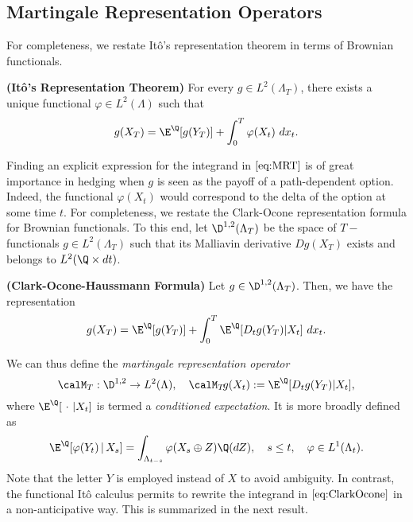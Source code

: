 \subsection{Martingale Representation Operators} \label{sec:MRO}
For completeness, we restate It\^o's representation theorem in terms of Brownian functionals.      

\begin{theorem}\label{thm:ClarkOcone}\textbf{(It\^o's Representation Theorem)}
For every $g\in L^2(\Lambda_T)$, there exists a unique functional $\varphi \in L^2(\Lambda)$ such that
\begin{equation}\label{eq:MRT} 
    g(X_T) = \E^{\Q}[g(Y_T)] + \int_0^T \varphi(X_t) \ dx_t. 
\end{equation}
\end{theorem}
Finding an explicit expression for the integrand in $\eqref{eq:MRT}$ is of great importance in hedging when $g$ is seen as the payoff of a path-dependent option. Indeed, the functional $\varphi(X_t)$ would correspond to the delta of the option at some time $t$.  
For completeness, we restate the Clark-Ocone representation formula \cite{Clark,Ocone} for Brownian functionals. To this end, let $\D^{1,2}(\Lambda_T)$ be the space of $T-$functionals $g\in L^2(\Lambda_T)$
such that its Malliavin derivative $ D g(X_T)$ exists and belongs to $L^2(\Q\times dt)$. 
\begin{theorem}\label{thm:ClarkOcone}\textbf{(Clark-Ocone-Haussmann Formula)}
Let $g\in \D^{1,2}(\Lambda_T)$. Then, we have the representation 
\begin{equation}\label{eq:ClarkOcone} 
    g(X_T) = \E^{\Q}[g(Y_T)] + \int_0^T \E^{\Q}[D_t g(Y_T) | X_t] \ dx_t. 
\end{equation}
\end{theorem}
We can thus define the \textit{martingale representation operator} $$\calM_T: \D^{1,2} \to L^2(\Lambda), \quad
\calM_T \! g(X_t) := \E^{\Q}[D_t g(Y_T) | X_t],$$ 
 where  $\E^{\Q}[ \ \cdot \ | X_t]$ is termed a \textit{conditioned expectation}. %
It is more broadly defined  as 
$$\E^{\Q}[\varphi(Y_t)\,|\, X_s]=  \int_{\Lambda_{t-s}}\varphi(X_s \oplus Z) \Q(dZ),\quad  s \le t ,\quad \varphi\in L^1(\Lambda_t). $$ 
 Note that  the letter $Y$ is employed %
 instead of $X$ to avoid ambiguity. 
In contrast, the functional Itô calculus permits to rewrite the integrand in $\eqref{eq:ClarkOcone}$ in a non-anticipative way.  This is summarized in the next result. 

